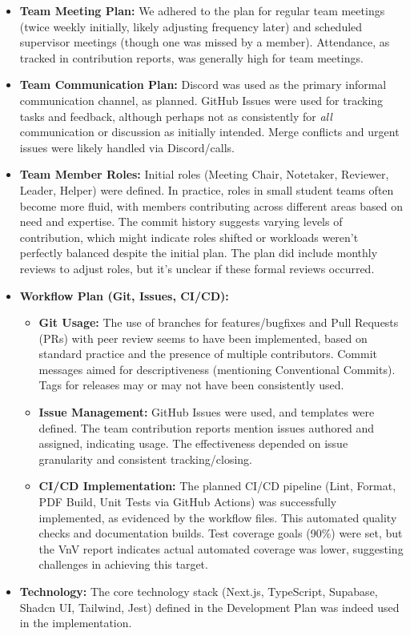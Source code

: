 \documentclass{article}
\begin{document}
\begin{itemize}
    \item \textbf{Team Meeting Plan:} We adhered to the plan for regular team meetings (twice weekly initially, likely adjusting frequency later) and scheduled supervisor meetings (though one was missed by a member). Attendance, as tracked in contribution reports, was generally high for team meetings.
    \item \textbf{Team Communication Plan:} Discord was used as the primary informal communication channel, as planned. GitHub Issues were used for tracking tasks and feedback, although perhaps not as consistently for \textit{all} communication or discussion as initially intended. Merge conflicts and urgent issues were likely handled via Discord/calls.
    \item \textbf{Team Member Roles:} Initial roles (Meeting Chair, Notetaker, Reviewer, Leader, Helper) were defined. In practice, roles in small student teams often become more fluid, with members contributing across different areas based on need and expertise. The commit history suggests varying levels of contribution, which might indicate roles shifted or workloads weren't perfectly balanced despite the initial plan. The plan did include monthly reviews to adjust roles, but it's unclear if these formal reviews occurred.
    \item \textbf{Workflow Plan (Git, Issues, CI/CD):}
        \begin{itemize}
            \item \textbf{Git Usage:} The use of branches for features/bugfixes and Pull Requests (PRs) with peer review seems to have been implemented, based on standard practice and the presence of multiple contributors. Commit messages aimed for descriptiveness (mentioning Conventional Commits). Tags for releases may or may not have been consistently used.
            \item \textbf{Issue Management:} GitHub Issues were used, and templates were defined. The team contribution reports mention issues authored and assigned, indicating usage. The effectiveness depended on issue granularity and consistent tracking/closing.
            \item \textbf{CI/CD Implementation:} The planned CI/CD pipeline (Lint, Format, PDF Build, Unit Tests via GitHub Actions) was successfully implemented, as evidenced by the workflow files. This automated quality checks and documentation builds. Test coverage goals (90\%) were set, but the VnV report indicates actual automated coverage was lower, suggesting challenges in achieving this target.
        \end{itemize}
    \item \textbf{Technology:} The core technology stack (Next.js, TypeScript, Supabase, Shadcn UI, Tailwind, Jest) defined in the Development Plan was indeed used in the implementation.
\end{itemize}
\end{document}
